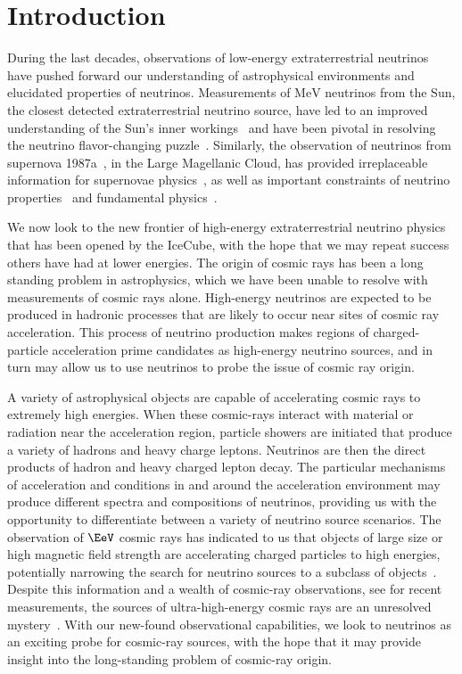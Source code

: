 \chapter{Introduction}

During the last decades, observations of low-energy extraterrestrial neutrinos have pushed forward our understanding of astrophysical environments and elucidated properties of neutrinos.
Measurements of $\si\MeV$ neutrinos from the Sun, the closest detected extraterrestrial neutrino source, have led to an improved understanding of the Sun's inner workings~\cite{Raffelt:1999tx,Bahcall:2004pz} and have been pivotal in resolving the neutrino flavor-changing puzzle~\cite{McDonald:2016ixn}.
Similarly, the observation of neutrinos from supernova 1987a~\cite{Hirata:1987hu,Bratton:1988ww}, in the Large Magellanic Cloud, has provided irreplaceable information for supernovae physics~\cite{Bethe:1990mw}, as well as important constraints of neutrino properties~\cite{Arnett:1987iz,Goldman:1987fg,Manohar:1987ec,Lattimer:1988mf} and fundamental physics~\cite{Raffelt:1987yt,Turner:1987by}.

We now look to the new frontier of high-energy extraterrestrial neutrino physics that has been opened by the IceCube, with the hope that we may repeat success others have had at lower energies.
The origin of cosmic rays has been a long standing problem in astrophysics, which we have been unable to resolve with measurements of cosmic rays alone.
High-energy neutrinos are expected to be produced in hadronic processes that are likely to occur near sites of cosmic ray acceleration.
This process of neutrino production makes regions of charged-particle acceleration prime candidates as high-energy neutrino sources, and in turn may allow us to use neutrinos to probe the issue of cosmic ray origin.

A variety of astrophysical objects are capable of accelerating cosmic rays to extremely high energies.
When these cosmic-rays interact with material or radiation near the acceleration region, particle showers are initiated that produce a variety of hadrons and heavy charge leptons.
Neutrinos are then the direct products of hadron and heavy charged lepton decay.
The particular mechanisms of acceleration and conditions in and around the acceleration environment may produce different spectra and compositions of neutrinos, providing us with the opportunity to differentiate between a variety of neutrino source scenarios.
The observation of $\si\EeV$ cosmic rays has indicated to us that objects of large size or high magnetic field strength are accelerating charged particles to high energies, potentially narrowing the search for neutrino sources to a subclass of objects~\cite{gaisser1990cosmic,LetessierSelvon:2011dy}.
Despite this information and a wealth of cosmic-ray observations, see  for recent measurements, the sources of ultra-high-energy cosmic rays are an unresolved mystery~\cite{Kotera:2011cp}.
With our new-found observational capabilities, we look to neutrinos as an exciting probe for cosmic-ray sources, with the hope that it may provide insight into the long-standing problem of cosmic-ray origin.

